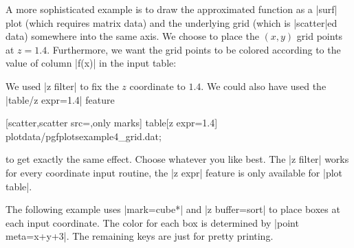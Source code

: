 {A more sophisticated example is to draw the approximated function as a |surf| plot (which requires matrix data) and the underlying grid (which is |scatter|ed data) somewhere into the same axis. We choose to place the $(x,y)$ grid points at $z=1.4$. Furthermore, we want the grid points to be colored according to the value of column |f(x)| in the input table:
\pgfplotsexpensiveexample
\begin{codeexample}[]
\end{codeexample}
\noindent We used |z filter| to fix the $z$ coordinate to $1.4$. We could also have used the |table/z expr=1.4| feature
\begin{codeexample}
	[scatter,scatter src=,only marks] 
		table[z expr=1.4] {plotdata/pgfplotsexample4_grid.dat};
\end{codeexample}
\noindent to get exactly the same effect. Choose whatever you like best. The |z filter| works for every coordinate input routine, the |z expr| feature is only available for |plot table|.


The following example uses |mark=cube*| and |z buffer=sort| to place boxes at each input coordinate. The color for each box is determined by |point meta={x+y+3}|. The remaining keys are just for pretty printing.
\pgfplotsexpensiveexample
\begin{codeexample}[]
\end{codeexample}}
